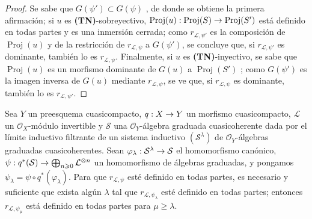\documentclass[oneside,10pt]{amsart}
\makeatletter
\renewcommand{\geq}{\geqslant}
\newcommand{\ega@arrow}[2]{\mathchoice{#1}{#2}{#2}{#2}}
\renewcommand{\to}{\ega@arrow{\longrightarrow}{\rightarrow}}
\let\EGAOriginalLabel\label
\renewcommand{\label}[1]{\phantomsection\EGAOriginalLabel{#1}}
\makeatother
\begin{document}
\begin{proof}
Se sabe que $G(\psi')\subset G(\psi)$ , de donde se obtiene la primera afirmación;
si $u$ es \textbf{(TN)}-sobreyectivo, $\operatorname{Proj}(u):\operatorname{Proj}(S)\to
\operatorname{Proj}(S')$ está definido en todas partes y es una inmersión cerrada;
como $r_{\mathcal{L},\psi'}$ es la composición de $\operatorname{Proj}(u)$ y de la restricción de $r_{\mathcal{L},\psi}$ a $G(\psi')$, se concluye que, si $r_{\mathcal{L},\psi'}$ es dominante, también lo es $r_{\mathcal{L},\psi}$.
Finalmente, si $u$ es \textbf{(TN)}-inyectivo, se sabe que $\operatorname{Proj}(u)$ es un morfismo dominante de $G(u)$ a $\operatorname{Proj}(S')$ ;
como $G(\psi')$ es la imagen inversa de $G(u)$ mediante $r_{\mathcal{L},\psi}$, se ve que, si $r_{\mathcal{L},\psi}$ es dominante, también lo es $r_{\mathcal{L},\psi'}$.
\end{proof}

\begin{proposition}[3.7.7]
\label{II.3.7.7-fr}
Sea $Y$ un preesquema cuasicompacto, $q:X\to Y$ un morfismo cuasicompacto, $\mathcal{L}$ un $\mathcal{O}_X$-módulo invertible y $\mathcal{S}$ una $\mathcal{O}_Y$-álgebra graduada cuasicoherente dada por el límite inductivo filtrante de un sistema inductivo $(\mathcal{S}^\lambda)$ de $\mathcal{O}_Y$-álgebras graduadas cuasicoherentes.
Sean $\varphi_\lambda:\mathcal{S}^\lambda\to\mathcal{S}$ el homomorfismo canónico, $\psi:q^*(\mathcal{S})\to\bigoplus_{n\geq0}\mathcal{L}^{\otimes n}$ un homomorfismo de álgebras graduadas, y pongamos $\psi_\lambda=\psi\circ q^*(\varphi_\lambda)$.
Para que $r_{\mathcal{L},\psi}$ esté definido en todas partes, es necesario y suficiente que exista algún $\lambda$ tal que $r_{\mathcal{L},\psi_\lambda}$ esté definido en todas partes;
entonces $r_{\mathcal{L},\psi_\mu}$ está definido en todas partes para $\mu\geq\lambda$.
\end{proposition}
\end{document}
